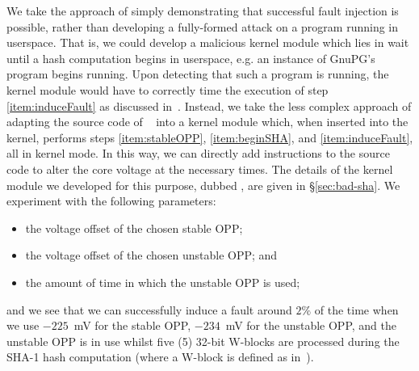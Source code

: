 We take the approach of simply demonstrating that successful fault injection is
possible, rather than developing a fully-formed attack on a program running in
userspace. That is, we could develop a malicious kernel module which lies in
wait until a hash computation begins in userspace, e.g. an
instance of GnuPG's  program begins running. Upon detecting that
such a program is running, the kernel module would have to correctly time the
execution of step \ref{item:induceFault} as discussed in~\cite[§3.5]{clkscrew}.
Instead, we take the less complex approach of adapting the source code of
~\cite{gnupgSHA} into a kernel module which, when inserted into
the kernel, performs steps \ref{item:stableOPP}, \ref{item:beginSHA}, and
\ref{item:induceFault}, all in kernel mode. In this way, we can directly add
instructions to the  source code to alter the core voltage at
the necessary times. The details of the kernel module we developed for this
purpose, dubbed , are given in §\ref{sec:bad-sha}. We experiment
with the following parameters:

\begin{itemize}
    \item the voltage offset of the chosen stable OPP;
    \item the voltage offset of the chosen unstable OPP; and
    \item the amount of time in which the unstable OPP is used;
\end{itemize}
and we see that we can successfully induce a fault around $2\%$ of
the time when we use $-225$~mV for the stable OPP, $-234$~mV for the unstable
OPP, and the unstable OPP is in use whilst five (5) 32-bit W-blocks are processed
during the SHA-1 hash computation (where a W-block is defined as in~\cite[§6.1]{rfcSHA}).


